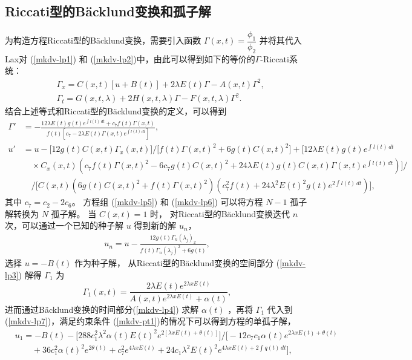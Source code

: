 \subsection{Riccati型的B\"{a}cklund变换和孤子解}
为构造方程Riccati型的B\"{a}cklund变换，需要引入函数 $\Gamma(x,t)=\dfrac{\phi_1}{\phi_2}$  并将其代入 Lax对  (\ref{mkdv-lp1}) 和 (\ref{mkdv-lp2})中，由此可以得到如下的等价的$\Gamma$-Riccati系统：
\begin{align}
&\Gamma_x=C(x,t)[u+B(t)]+2  \lambda E(t) \Gamma - A(x,t)\Gamma^2,\label{mkdv-lp3}\\
&\Gamma_t=G(x,t,\lambda) + 2 H(x,t,\lambda) \Gamma - F(x,t,\lambda) \Gamma^2.\label{mkdv-lp4}
\end{align}
结合上述等式和Riccati型的B\"{a}cklund变换的定义，可以得到
\begin{align}
\Gamma'&=-\frac{ 12 \lambda  E(t) g(t)  e^{\int l(t) \, dt}+c_7 f(t) \Gamma (x,t)}{f(t) \left[c_7-2 \lambda  E(t) \Gamma (x,t) e^{\int l(t) \, dt}\right]},\label{mkdv-lp5}\\
\nonumber u'&=u -\big[12  g(t) C(x,t) \Gamma _x(x,t) \big]/\big[f(t) \Gamma(x,t)^2+6  g(t) C(x,t)^2\big] + \big[12 \lambda  E(t) g(t)  e^{\int l(t) \, dt} \\
 &\quad \times C_x(x,t) (c_7 f(t) \Gamma(x,t)^2- 6 c_7 g(t) C(x,t)^2+24 \lambda  E(t) g(t) C(x,t) \Gamma(x,t) e^{\int l(t) \, dt})\big]/ \label{mkdv-lp6}
 \\
\nonumber & \quad / \big[C(x,t) (6 g(t) C(x,t)^2+f(t) \Gamma(x,t) ^2) (c_7^2 f(t)+24 \lambda ^2 E(t)^2 g(t) e^{2 \int l(t) \, dt})\big],
\end{align}
其中 $c_7=c_2-2c_6$。
方程组 (\ref{mkdv-lp5}) 和 (\ref{mkdv-lp6}) 可以将方程
$N-1$ 孤子解转换为 $N$ 孤子解。 当 $C(x,t)=1$ 时， 对Riccati型的B\"{a}cklund变换迭代 $n$ 次，可以通过一个已知的种子解 $u$ 得到新的解 $u_n$，
\begin{align}
u_n=u-\frac{12 g(t)\Gamma_n (\lambda_j) _x }{f(t) \Gamma_n  (\lambda_j)^2+6 g(t)}, \label{mkdv-lp7}
\end{align}
选择 $u=-B(t)$ 作为种子解， 从Riccati型的B\"{a}cklund变换的空间部分 (\ref{mkdv-lp3}) 解得 $\Gamma_1$ 为
\begin{equation}
\Gamma _1(x,t)=\frac{2 \lambda  E(t) e^{2 \lambda  x E(t)}}{A(x,t) e^{2 \lambda  x E(t)}+\alpha(t)},  \label{lp20}
\end{equation}
进而通过B\"{a}cklund变换的时间部分(\ref{mkdv-lp4}) 求解 $\alpha(t)$ ，再将 $\Gamma _1$ 代入到 (\ref{mkdv-lp7})，满足约束条件 (\ref{mkdv-pt1})的情况下可以得到方程的单孤子解，
\begin{align}
\nonumber
& u_1=-B(t)-\big[288 c_1^2 \lambda ^2 \alpha(t) E(t)^2 e^{ 2 [\lambda  x E(t)+\theta(t)]}\big]/ \big[-12 c_7 c_1 \alpha(t) e^ {2 \lambda  x E(t)+\theta(t)}
\\
&\quad \quad +36 c_1^2 \alpha(t)^2 e^ { 2 \theta(t)}+c_7^2 e^{4 \lambda  x E(t)} + 24  c_1  \lambda ^2 E(t)^2 e^{4 \lambda  x E(t)+2\int  q(t) \, dt} \big]
,\label{mkdv-lp10-1}
\end{align}
